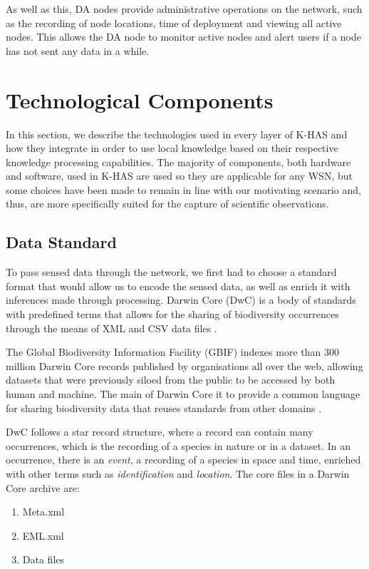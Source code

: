 	As well as this, DA nodes provide administrative operations on the network, such as the recording of node locations, time of deployment and viewing all active nodes. This allows the DA node to monitor active nodes and alert users if a node has not sent any data in a while.
	
	
	\section{Technological Components}
	In this section, we describe the technologies used in every layer of K-HAS and how they integrate in order to use local knowledge based on their respective knowledge processing capabilities. The majority of components, both hardware and software, used in K-HAS are used so they are applicable for any WSN, but some choices have been made to remain in line with our motivating scenario and, thus, are more specifically suited for the capture of scientific observations.
	
	\subsection{Data Standard}
		To pass sensed data through the network, we first had to choose a standard format that would allow us to encode the sensed data, as well as enrich it with inferences made through processing. Darwin Core (DwC) is a body of standards with predefined terms that allows for the sharing of biodiversity occurrences through the means of XML and CSV data files \cite{Wieczorek2012b}.

The Global Biodiversity Information Facility (GBIF) indexes more than 300 million Darwin Core records published by organisations all over the web, allowing datasets that were previously siloed from the public to be accessed by both human and machine. The main of Darwin Core it to provide a common language for sharing biodiversity data that reuses standards from other domains \cite{Wieczorek2012a}.

DwC follows a star record structure, where a record can contain many occurrences, which is the recording of a species in nature or in a dataset. In an occurrence, there is an \textit{event}, a recording of a species in space and time, enriched with other terms such as \textit{identification} and \textit{location}. The core files in a Darwin Core archive are:
\begin{enumerate}
	\item Meta.xml
	\item EML.xml
	\item Data files
\end{enumerate}

